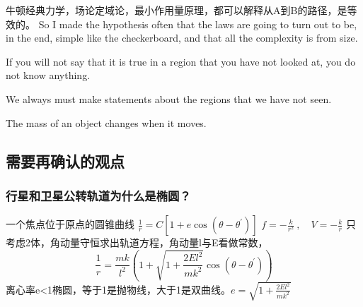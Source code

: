 牛顿经典力学，场论定域论，最小作用量原理，都可以解释从A到B的路径，是等效的。
So I made the hypothesis often that the laws are going to turn out to be, in the end, simple like the checkerboard, and that all the complexity is from size.

If you will not say that it is true in a region that you have not looked at, you do not know anything.

We always must make statements about the regions that we have not seen.

The mass of an object changes when it moves.

\subsection{需要再确认的观点}
\subsubsection{行星和卫星公转轨道为什么是椭圆？}

一个焦点位于原点的圆锥曲线
$\frac{1}{r}=C\left[1+e\cos(\theta-\theta^{\prime})\right]$
$f=-\frac{k}{r^{2}}~,\quad V=-\frac{k}{r}$
只考虑2体，角动量守恒求出轨道方程，角动量l与E看做常数，
$$\frac{1}{r}=\frac{mk}{l^{2}}\left(1+\sqrt{1+\frac{2El^{2}}{mk^{2}}}\cos(\theta-\theta^{\prime})\right)$$
离心率e<1椭圆，等于1是抛物线，大于1是双曲线。$e=\sqrt{1+\frac{2El^{2}}{mk^{2}}}$



